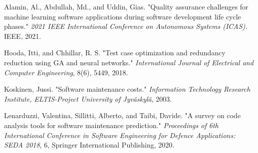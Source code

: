 \documentclass[11pt]{article}
\begin{document}
\begin{thebibliography}{9}  %

Alamin, Al., Abdullah, Md., and Uddin, Gias.
"Quality assurance challenges for machine learning software applications during software development life cycle phases."
\textit{2021 IEEE International Conference on Autonomous Systems (ICAS).}
IEEE, 2021.

Hooda, Itti, and Chhillar, R. S.
"Test case optimization and redundancy reduction using GA and neural networks."
\textit{International Journal of Electrical and Computer Engineering},
8(6), 5449, 2018.

Koskinen, Jussi.
"Software maintenance costs."
\textit{Information Technology Research Institute, ELTIS-Project University of Jyväskylä},
2003.

Lenarduzzi, Valentina, Sillitti, Alberto, and Taibi, Davide.
"A survey on code analysis tools for software maintenance prediction."
\textit{Proceedings of 6th International Conference in Software Engineering for Defence Applications: SEDA 2018},
6, Springer International Publishing, 2020.

\end{thebibliography}
\end{document}
